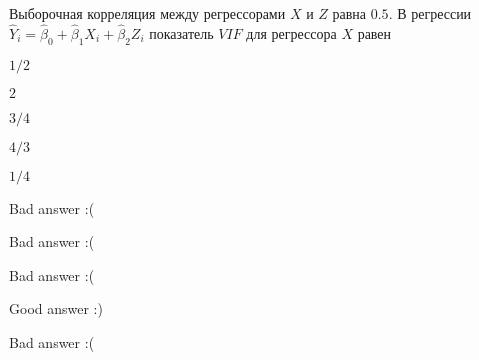 
\begin{question}
Выборочная корреляция между регрессорами \(X\) и \(Z\) равна \(0.5\).
В регрессии \(\hat Y_i = \hat\beta_0 + \hat\beta_1 X_i + \hat\beta_2 Z_i\) показатель \(VIF\) для регрессора \(X\) равен
\begin{answerlist}
  \item \(1/2\)
  \item \(2\)
  \item \(3/4\)
  \item \(4/3\)
  \item \(1/4\)
\end{answerlist}
\end{question}

\begin{solution}
\begin{answerlist}
  \item Bad answer :(
  \item Bad answer :(
  \item Bad answer :(
  \item Good answer :)
  \item Bad answer :(
\end{answerlist}
\end{solution}

